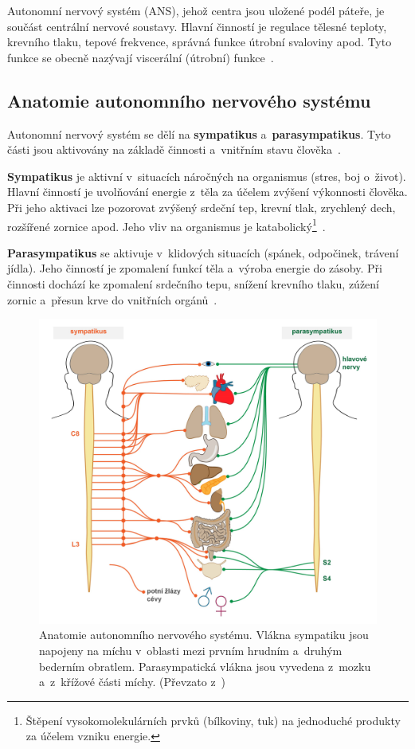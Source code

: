     Autonomní nervový systém (ANS), jehož centra jsou uložené podél páteře, je součást centrální nervové soustavy. Hlavní činností je regulace tělesné teploty, krevního tlaku, tepové frekvence, správná funkce útrobní svaloviny apod. Tyto funkce se obecně nazývají viscerální (útrobní) funkce~\cite{ans}.  
    
    \subsection{Anatomie autonomního nervového systému}
    Autonomní nervový systém se dělí na \textbf{sympatikus} a~\textbf{parasympatikus}. Tyto části jsou aktivovány na základě činnosti a~vnitřním stavu člověka~\cite{wiki_ans}.
    
    \textbf{Sympatikus} je aktivní v~situacích náročných na organismus (stres, boj o~život). Hlavní činností je uvolňování energie z~těla za účelem zvýšení výkonnosti člověka. Při jeho aktivaci lze pozorovat zvýšený srdeční tep, krevní tlak, zrychlený dech, rozšířené zornice apod. Jeho vliv na organismus je katabolický\footnote{Štěpení vysokomolekulárních prvků (bílkoviny, tuk) na jednoduché produkty za účelem vzniku energie.}~\cite{ans_s_p}.
    
    \textbf{Parasympatikus} se aktivuje v~klidových situacích (spánek, odpočinek, trávení jídla). Jeho činností je zpomalení funkcí těla a~výroba energie do zásoby. Při činnosti dochází ke zpomalení srdečního tepu, snížení krevního tlaku, zúžení zornic a~přesun krve do vnitřních orgánů~\cite{ans_s_p}.
    
    \begin{figure}[H]
        \centering
        \includegraphics[scale=0.3]{obrazky-figures/sympatikus_parasympatikus.png}
        \caption{Anatomie autonomního nervového systému. Vlákna sympatiku jsou napojeny na míchu v~oblasti mezi prvním hrudním a~druhým bederním obratlem. Parasympatická vlákna jsou vyvedena z~mozku a~z~křížové části míchy. (Převzato z~\cite{ans})}
        \label{fig:symp_parasymp}
    \end{figure}
    
